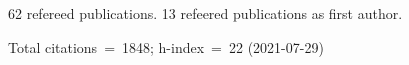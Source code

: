 62 refereed publications. 13 refeered publications as first author.

Total citations~=~1848; h-index~=~22 (2021-07-29)